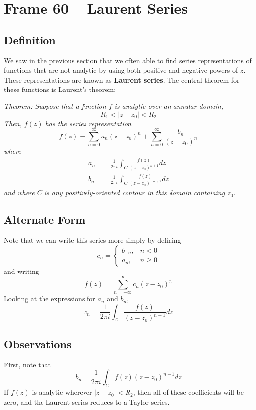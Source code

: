 \documentclass{article}
\renewcommand{\emph}{\textbf}
\begin{document}
\clearpage
\section{Frame 60 -- Laurent Series}
\subsection{Definition}
We saw in the previous section that we often able to find series representations of functions that are not analytic by using both positive and negative powers of $z$. These representations are known as \emph{Laurent series}. The central theorem for these functions is Laurent's theorem:

\textit{Theorem: Suppose that a function $f$ is analytic over an annular domain,
\[
	R_1 < |z - z_0| < R_2
\]
Then, $f(z)$ has the series representation
\[
	f(z) 
	= \sum_{n=0}^\infty a_n (z - z_0)^n
	+ \sum_{n=0}^\infty \frac{b_n}{(z - z_0)^n}
\]
where
\begin{align*}
	a_n &= \frac{1}{2\pi i} \int_C \frac{f(z)}{(z - z_0)^{ n+1}} dz \\
	b_n &= \frac{1}{2\pi i} \int_C \frac{f(z)}{(z - z_0)^{-n+1}} dz
\end{align*}
and where $C$ is any positively-oriented contour in this domain containing $z_0$.}

\subsection{Alternate Form}
Note that we can write this series more simply by defining
\[
	c_n = 
	\begin{cases}
		b_{-n},	& n < 0 \\
		a_n,	& n \ge 0
	\end{cases}
\]
and writing
\[
	f(z) = \sum_{n=-\infty}^\infty c_n (z - z_0)^n
\]
Looking at the expressions for $a_n$ and $b_n$,
\[
	c_n = \frac{1}{2\pi i} \int_C \frac{f(z)}{(z - z_0)^{n+1}} dz
\]

\subsection{Observations}
First, note that
\[
	b_n = \frac{1}{2\pi i} \int_C f(z) (z - z_0)^{n-1} dz
\]
If $f(z)$ is analytic wherever $|z - z_0| < R_2$, then all of these coefficients will be zero, and the Laurent series reduces to a Taylor series. 
\end{document}

